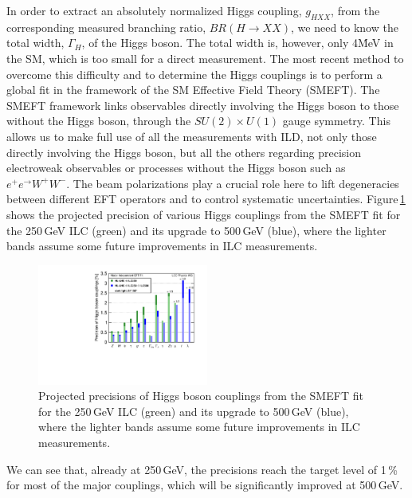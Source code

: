 In order to extract an absolutely normalized Higgs coupling, $g_{HXX}$, from the corresponding measured branching ratio, $BR(H \to XX)$, we need to know the total width, $\Gamma_H$, of the Higgs boson. The total width is, however, only 4\.MeV in the SM, which is too small for a direct measurement. The most recent method to overcome this difficulty and to determine the Higgs couplings is to perform a global fit in the framework of the SM Effective Field Theory (SMEFT)\cite{Barklow:2017suo,Barklow:2017awn}. The SMEFT framework links observables directly involving the Higgs boson to those without the Higgs boson, through the $SU(2) \times U(1)$ gauge symmetry. This allows us to make full use of all the measurements with ILD, not only those directly involving the Higgs boson, but all the others regarding precision electroweak observables or processes without the Higgs boson such as $e^+e^ \to W^+W^-$\cite{Karl:2019hes}. The beam polarizations play a crucial role here to lift degeneracies between different EFT operators and to control systematic uncertainties. Figure\,\ref{fig:Manhattan} shows the projected precision of various Higgs couplings from the SMEFT fit for the 250\,GeV ILC (green) and its upgrade to 500\,GeV (blue), where the lighter bands assume some future improvements in ILC measurements\cite{ILCESU1}.
\begin{figure}[htbp]
\begin{center}
 \includegraphics[width=0.5\textwidth]{Science/fig/DeltaHXX_SM_ILC_MI_S12s.pdf}
\end{center}
\caption{Projected precisions of Higgs boson couplings from the SMEFT fit for the 250\,GeV ILC (green) and its upgrade to 500\,GeV (blue), where the lighter bands assume some future improvements in ILC measurements\cite{ILCESU1}.
}
\label{fig:Manhattan}
\end{figure}
We can see that, already at 250\,GeV, the precisions reach the target level of 1\,\% for most of the major couplings, which will be significantly improved at 500\,GeV.
%
%

